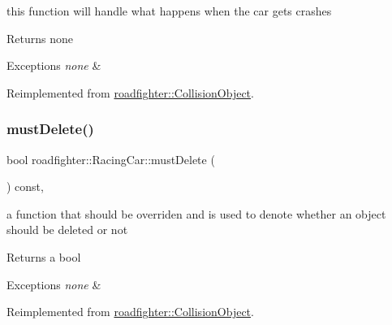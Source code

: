 this function will handle what happens when the car gets crashes \begin{DoxyReturn}{Returns}
none 
\end{DoxyReturn}

\begin{DoxyExceptions}{Exceptions}
{\em none} & \\
\hline
\end{DoxyExceptions}


Reimplemented from \hyperlink{classroadfighter_1_1CollisionObject_a9a5265d810f0ed7583b60046ab3fa88c}{roadfighter\+::\+Collision\+Object}.

\mbox{\label{classroadfighter_1_1RacingCar_a300bccb330cc8e84834edd5f85354a10}} 
\subsubsection{\texorpdfstring{must\+Delete()}{mustDelete()}}
{\footnotesize\ttfamily bool roadfighter\+::\+Racing\+Car\+::must\+Delete (\begin{DoxyParamCaption}{ }\end{DoxyParamCaption}) const\hspace{0.3cm}{\ttfamily [override]}, {\ttfamily [virtual]}}

a function that should be overriden and is used to denote whether an object should be deleted or not \begin{DoxyReturn}{Returns}
a bool 
\end{DoxyReturn}

\begin{DoxyExceptions}{Exceptions}
{\em none} & \\
\hline
\end{DoxyExceptions}


Reimplemented from \hyperlink{classroadfighter_1_1CollisionObject_a738071cd7b1b8cd4c8d455b5e552bd4c}{roadfighter\+::\+Collision\+Object}.

\mbox{\label{classroadfighter_1_1RacingCar_a2df3fdffc4c55aa85a6d9265913aa7b0}} 
